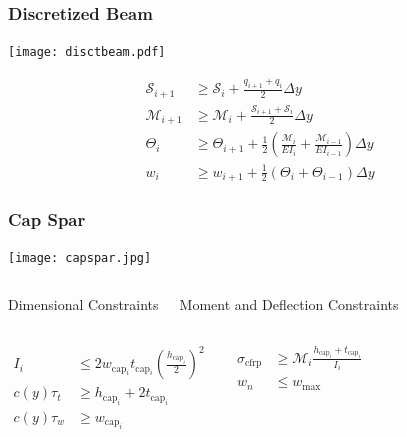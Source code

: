 \documentclass{beamer}
\begin{document}
\begin{frame}
    \frametitle{Discretized Beam}

    \begin{center}
        \texttt{[image: disctbeam.pdf]}
    \end{center}

    \begin{align*}
        \mathcal{S}_{i+1} &\geq \mathcal{S}_i + \frac{q_{i+1} + q_i}{2} \Delta y \\
        \mathcal{M}_{i+1} &\geq \mathcal{M}_i + \frac{\mathcal{S}_{i+1} + \mathcal{S}_i}{2} \Delta y \\
        \Theta_{i} &\geq \Theta_{i+1} + \frac{1}{2} \left(\frac{\mathcal{M}_i}{EI_i} + \frac{\mathcal{M}_{i-1}}{EI_{i-1}} \right) \Delta y \\
        w_{i} &\geq w_{i+1} + \frac{1}{2} (\Theta_i + \Theta_{i-1}) \Delta y 
    \end{align*}
\end{frame}

\begin{frame}
    \frametitle{Cap Spar}

    \begin{center}
    \texttt{[image: capspar.jpg]}
    \end{center}

    \begin{columns}
        \begin{center}
        Dimensional Constraints
        \end{center}
        \begin{center}
        Moment and Deflection Constraints
        \end{center}
    \end{columns}
    
    \begin{columns}
        \begin{align*}
            I_i &\leq 2w_{\text{cap}_i}t_{\text{cap}_i}\left(\frac{h_{\text{cap}_i}}{2}\right)^2 \\
            c(y)\tau_t &\geq h_{\text{cap}_i} + 2t_{\text{cap}_i} \\
            c(y)\tau_w &\geq w_{\text{cap}_i} 
        \end{align*}

        \begin{align*}
            \sigma_{\text{cfrp}} &\geq \mathcal{M}_i \frac{h_{\text{cap}_i}+t_{\text{cap}_i}}{I_i}\\
            w_n &\leq w_{\text{max}}
        \end{align*}
        
    \end{columns}

\end{frame}
\end{document}
